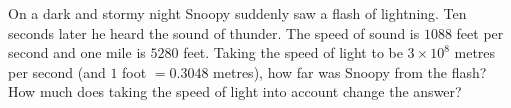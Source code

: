 On a dark and stormy night Snoopy suddenly saw a flash of lightning. Ten seconds later he heard the sound of thunder. The speed of sound is $1088$ feet per second and one mile is $5280$ feet. Taking the speed of light to be $3\times10^8$ metres per second (and $1$ foot $=0.3048$ metres), how far was Snoopy from the flash? How much does taking the speed of light into account change the answer?
